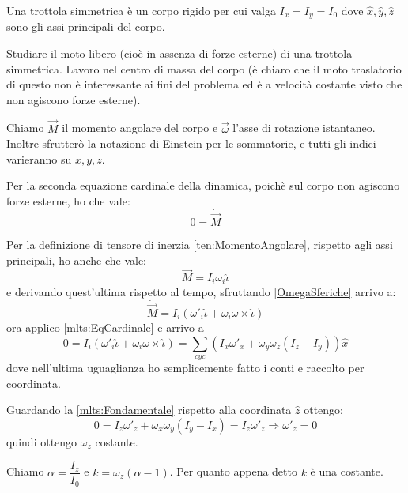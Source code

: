 \documentclass[../main.tex]{subfiles}
\begin{document}

\textex
Una trottola simmetrica è un corpo rigido per cui valga $I_x=I_y=I_0$ dove $\hat x, \hat y, \hat z$ sono gli assi principali del corpo.

Studiare il moto libero (cioè in assenza di forze esterne) di una trottola simmetrica.
\solution
Lavoro nel centro di massa del corpo (è chiaro che il moto traslatorio di questo non è interessante ai fini del problema ed è a velocità costante visto che non agiscono forze esterne).

Chiamo $\overrightarrow M$ il momento angolare del corpo e $\vec{\omega}$ l'asse di rotazione istantaneo. Inoltre sfrutterò la notazione di Einstein per le sommatorie, e tutti gli indici varieranno su $x,y,z$.

Per la seconda equazione cardinale della dinamica, poichè sul corpo non agiscono forze esterne, ho che vale:
\begin{equation}\label{mlts:EqCardinale}
	0=\dot{\overrightarrow M}
\end{equation}

Per la definizione di tensore di inerzia \cref{ten:MomentoAngolare}, rispetto agli assi principali, ho anche che vale:
\begin{equation}\label{mlts:MomentoComponenti}
	\overrightarrow M = I_i\omega_i \hat\iota
\end{equation}
e derivando quest'ultima rispetto al tempo, sfruttando \cref{OmegaSferiche} arrivo a:
\begin{equation*}
	\dot{\overrightarrow M}= I_i\left(\omega'_i\hat\iota + \omega_i\omega\times \hat\iota\right)
\end{equation*}
ora applico \cref{mlts:EqCardinale} e arrivo a
\begin{equation}\label{mlts:Fondamentale}
	0=I_i\left(\omega'_i\hat\iota + \omega_i\omega\times \hat\iota\right) =
	\sum_{cyc} \left( I_x\omega'_x+\omega_y\omega_z(I_z-I_y) \right)\hat x
\end{equation}
dove nell'ultima uguaglianza ho semplicemente fatto i conti e raccolto per coordinata.

Guardando la \cref{mlts:Fondamentale} rispetto alla coordinata $\hat z$ ottengo:
\begin{equation*} 
	0=I_z\omega'_z+\omega_x\omega_y(I_y-I_x)=I_z\omega'_z\Rightarrow \omega'_z=0
\end{equation*}
quindi ottengo $\omega_z$ costante.

Chiamo $\alpha=\dfrac{I_z}{I_0}$ e $k=\omega_z(\alpha-1)$. Per quanto appena detto $k$ è una costante.
\end{document}
